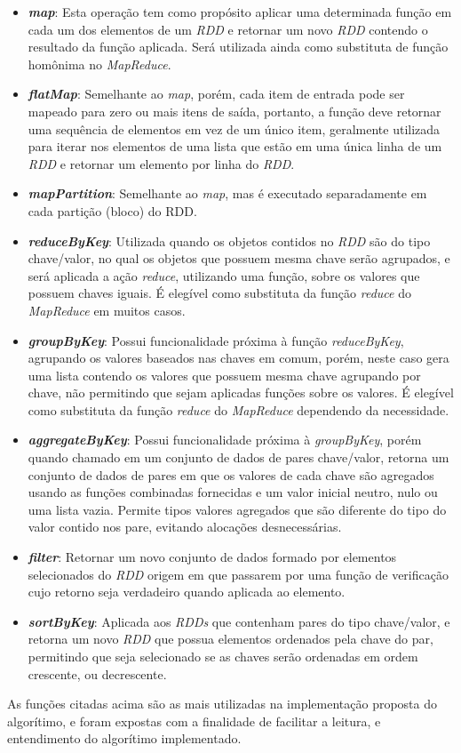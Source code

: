\begin{itemize}
\item \textit{\textbf{map}}: Esta operação tem como propósito aplicar uma determinada função em cada um dos elementos de um \textit{RDD} e retornar um novo \textit{RDD} contendo o resultado da função aplicada. Será utilizada ainda como substituta de função homônima no \textit{MapReduce}.
\item \textit{\textbf{flatMap}}: Semelhante ao \textit{map}, porém, cada item de entrada pode ser mapeado para zero ou mais itens de saída, portanto, a função deve retornar uma sequência de elementos em vez de um único item, geralmente utilizada para iterar nos elementos de uma lista que estão em uma única linha de um \textit{RDD} e retornar um elemento por linha do \textit{RDD}.
\item \textit{\textbf{mapPartition}}: Semelhante ao \textit{map}, mas é executado separadamente em cada partição (bloco) do RDD.
\item \textit{\textbf{reduceByKey}}: Utilizada quando os objetos contidos no \textit{RDD} são do tipo chave/valor, no qual os objetos que possuem mesma chave serão agrupados, e será aplicada a ação \textit{reduce}, utilizando uma função, sobre os valores que possuem chaves iguais. É elegível como substituta da função \textit{reduce} do \textit{MapReduce} em muitos casos.
\item \textit{\textbf{groupByKey}}: Possui funcionalidade próxima à função \textit{reduceByKey}, agrupando os valores baseados nas chaves em comum, porém, neste caso gera uma lista contendo os valores que possuem mesma chave agrupando por chave, não permitindo que sejam aplicadas funções sobre os valores. É elegível como substituta da função \textit{reduce} do \textit{MapReduce} dependendo da necessidade.
\item \textbf{\textit{aggregateByKey}}: Possui funcionalidade próxima à \textit{groupByKey}, porém quando chamado em um conjunto de dados de pares chave/valor, retorna um conjunto de dados de pares em que os valores de cada chave são agregados usando as funções combinadas fornecidas e um valor inicial neutro, nulo ou uma lista vazia. Permite tipos valores agregados que são diferente do tipo do valor contido nos pare, evitando alocações desnecessárias.
\item \textbf{\textit{filter}}: Retornar um novo conjunto de dados formado por elementos selecionados do \textit{RDD} origem em que passarem por uma função de verificação cujo retorno seja verdadeiro quando aplicada ao elemento.
\item \textbf{\textit{sortByKey}}: Aplicada aos \textit{RDDs} que contenham pares do tipo chave/valor, e retorna um novo \textit{RDD} que possua elementos ordenados pela chave do par, permitindo que seja selecionado se as chaves serão ordenadas em ordem crescente, ou decrescente.
\end{itemize}

As funções citadas acima são as mais utilizadas na implementação proposta do algorítimo, e foram expostas com a finalidade de facilitar a leitura, e entendimento do algorítimo implementado.










